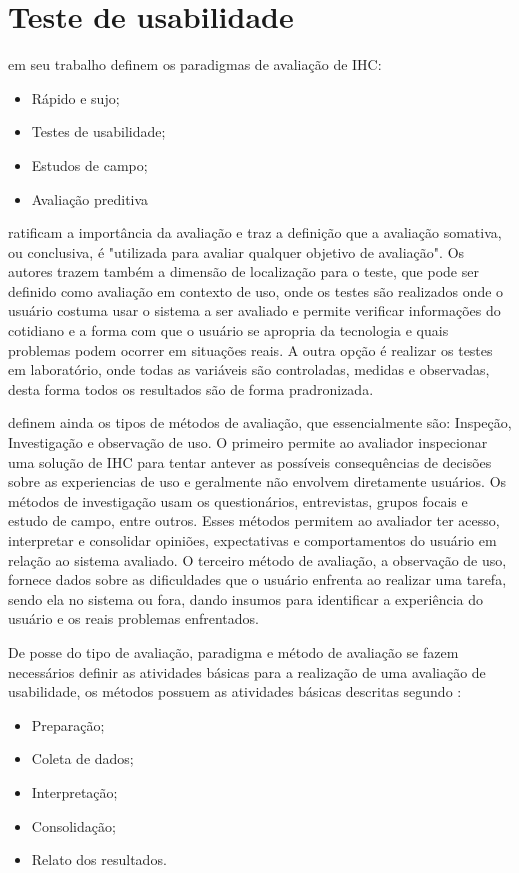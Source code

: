 \section{Teste de usabilidade}

\cite{preece2005} em seu trabalho definem os paradigmas de avaliação de IHC:
\begin{itemize}
	\item Rápido e sujo;
	\item Testes de usabilidade;
	\item Estudos de campo;
	\item Avaliação preditiva
\end{itemize}

\cite{diniz2010} ratificam a importância da avaliação e traz a definição que a avaliação somativa, ou conclusiva, é "utilizada para avaliar qualquer objetivo de avaliação". Os autores trazem também a dimensão de localização para o teste, que pode ser definido como avaliação em contexto de uso, onde os testes são realizados onde o usuário costuma usar o sistema a ser avaliado e permite verificar informações do cotidiano e a forma com que o usuário se apropria da tecnologia e quais problemas podem ocorrer em situações reais. A outra opção é realizar os testes em laboratório, onde todas as variáveis são controladas, medidas e observadas, desta forma todos os resultados são de forma pradronizada.

\cite{diniz2010} definem ainda os tipos de métodos de avaliação, que essencialmente são: Inspeção, Investigação e observação de uso. O primeiro permite ao avaliador inspecionar uma solução de IHC para tentar antever as possíveis consequências de decisões sobre as experiencias de uso e geralmente não envolvem diretamente usuários.
Os métodos de investigação usam os questionários, entrevistas, grupos focais e estudo de campo, entre outros. Esses métodos permitem ao avaliador ter acesso, interpretar e consolidar opiniões, expectativas e comportamentos do usuário em relação ao sistema avaliado.
O terceiro método de avaliação, a observação de uso, fornece dados sobre as dificuldades que o usuário enfrenta ao realizar uma tarefa, sendo ela no sistema ou fora, dando insumos para identificar a experiência do usuário e os reais problemas enfrentados.

De posse do tipo de avaliação, paradigma e método de avaliação se fazem necessários definir as atividades básicas para a realização de uma avaliação de usabilidade, os métodos possuem as atividades básicas descritas segundo \cite{diniz2010}:
\begin{itemize}
	\item{Preparação;}
	\item{Coleta de dados;}
	\item{Interpretação;}
	\item{Consolidação;}
	\item{Relato dos resultados.}
\end{itemize}

